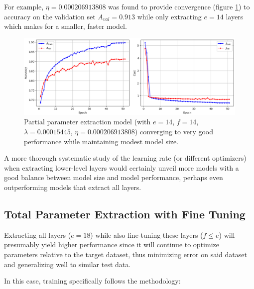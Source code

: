 For example, $\eta = 0.000206913808$ was found to provide convergence (figure \ref{fig:vgg16_partial_convergence}) to accuracy on the validation set $A_{val} = 0.913$ while only extracting $e = 14$ layers which makes for a smaller, faster model.

\begin{figure}[ht]
    \centering
    \includegraphics[width=1.0\textwidth]{figs/vgg16_partial_convergence.png}
    \caption{Partial parameter extraction model (with $e = 14$, $f = 14$, $\lambda = 0.00015445$, $\eta = 0.000206913808$) converging to very good performance while maintaining modest model size.}
    \label{fig:vgg16_partial_convergence}
\end{figure}

A more thorough systematic study of the learning rate (or different optimizers) when extracting lower-level layers would certainly unveil more models with a good balance between model size and model performance, perhaps even outperforming models that extract all layers.

\subsection{Total Parameter Extraction with Fine Tuning}
\label{section:total_parameter_extraction_with_fine_tuning}

Extracting all layers ($e = 18$) while also fine-tuning these layers ($f \leq e$) will presumably yield higher performance since it will continue to optimize parameters relative to the target dataset, thus minimizing error on said dataset and generalizing well to similar test data.

In this case, training specifically follows the methodology:

